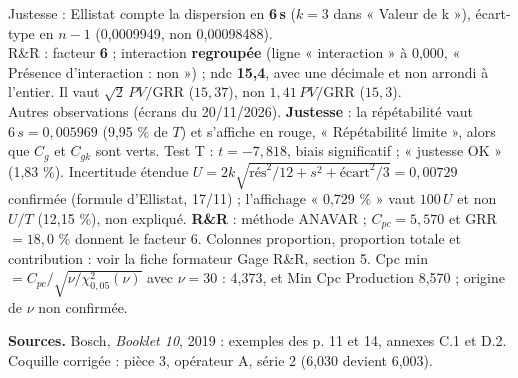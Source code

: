 \documentclass[10pt,a4paper]{article}
\begin{document}
Justesse : Ellistat compte la dispersion en \textbf{6\,s} ($k=3$ dans « Valeur de k »), écart-type en \textbf{$n-1$} (0,0009949, non 0,00098488).\\[3pt]
R\&R : facteur \textbf{6} ; interaction \textbf{regroupée} (ligne « interaction » à 0,000, « Présence d'interaction : non ») ; ndc \textbf{15,4}, avec une décimale et non arrondi à l'entier. Il vaut $\sqrt2\,PV/\text{GRR}$ ($15{,}37$), non $1{,}41\,PV/\text{GRR}$ ($15{,}3$).\\[3pt]
{\small Autres observations (écrans du 20/11/2026). \textbf{Justesse} : la répétabilité vaut $6\,s=0{,}005969$ (9,95 \% de $T$) et s'affiche en rouge, « Répétabilité limite », alors que $C_g$ et $C_{gk}$ sont verts. Test T : $t=-7{,}818$, biais significatif ; « justesse OK » (1,83 \%). Incertitude étendue $U=2k\sqrt{\text{rés}^2/12+s^2+\text{écart}^2/3}=0{,}00729$ confirmée (formule d'Ellistat, 17/11) ; l'affichage « 0,729 \% » vaut $100\,U$ et non $U/T$ (12,15 \%), non expliqué. \textbf{R\&R} : méthode ANAVAR ; $C_{pc}=5{,}570$ et GRR $=18{,}0$ \% donnent le facteur 6. Colonnes proportion, proportion totale et contribution : voir la fiche formateur Gage R\&R, section 5. Cpc min $=C_{pc}/\sqrt{\nu/\chi^2_{0{,}05}(\nu)}$ avec $\nu=30$ : 4,373, et Min Cpc Production 8,570 ; origine de $\nu$ non confirmée.}

\vspace{2pt}
{\scriptsize\color{uimm}\textbf{Sources.} Bosch, \emph{Booklet 10}, 2019 : exemples des p. 11 et 14, annexes C.1 et D.2. Coquille corrigée : pièce 3, opérateur A, série 2 (6,030 devient 6,003).}
\end{document}
